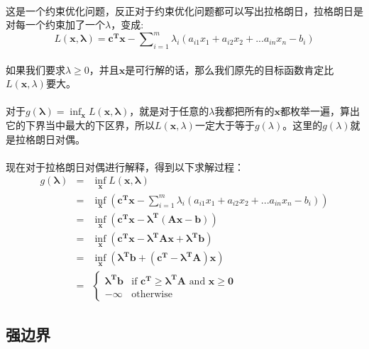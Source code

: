 	\paragraph{}这是一个约束优化问题，反正对于约束优化问题都可以写出拉格朗日，拉格朗日是对每一个约束加了一个$\lambda$，变成:
	\[
		L(\mathbf{x, \lambda}) = \mathbf{c^Tx} - \sum\nolimits_{i=1}^m \lambda_i ( a_{i1}x_{1} + a_{i2}x_{2} + ... a_{in}x_{n}  - b_i) 
	\]
	\paragraph{}如果我们要求$\lambda \geq 0$，并且$\bm{x}$是可行解的话，那么我们原先的目标函数肯定比$L(\bm{x},\lambda)$要大。
	\paragraph{}对于$g(\mathbf{\lambda} ) = \inf_{\mathbf{x} } L( \mathbf{x}, \mathbf{\lambda} )$，就是对于任意的$\lambda$我都把所有的$\bm{x}$都枚举一遍，算出它的下界当中最大的下区界，所以$L(\bm{x},\lambda)$一定大于等于$g(\lambda)$。这里的$g(\lambda)$就是拉格朗日对偶。
	\paragraph{}现在对于拉格朗日对偶进行解释，得到以下求解过程：
	\begin{eqnarray}
 		g(\mathbf{\lambda}) &= & \inf_{\mathbf{x}} L( \mathbf{x, \lambda} ) \nonumber \\
            				&=& \inf_{\mathbf{x}} ( \mathbf{c^Tx} - \sum\nolimits_{i=1}^m \lambda_i ( a_{i1}x_{1} + a_{i2}x_{2} + ... a_{in}x_{n}  - b_i) ) \nonumber \\
            				&=& \inf_{\mathbf{x}} (\mathbf{c^Tx - \lambda^T(Ax-b)})  \nonumber \\
            				&=& \inf_{\mathbf{x}} ( \mathbf{c^Tx - \lambda^TAx+\lambda^Tb}) \nonumber\\
            				&=& \inf_{\mathbf{x} } (  \mathbf{ \lambda^T b + (c^T - \lambda^T A) x } ) \nonumber\\
            				&=& \begin{cases} 
                        			\mathbf{ \lambda^T b}  & \text{if } \mathbf{ c^T \geq \lambda^T A} \text{\ and \ }  \mathbf{x \geq 0} \\ 
                         			-\infty         & \text{otherwise}
                     			\end{cases} \nonumber
	\end{eqnarray}
	\subsection{强边界}
